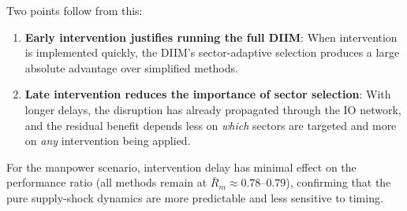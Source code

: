 Two points follow from this:
\begin{enumerate}
    \item \textbf{Early intervention justifies running the full DIIM}: When intervention is implemented quickly, the DIIM's sector-adaptive selection produces a large absolute advantage over simplified methods.
    \item \textbf{Late intervention reduces the importance of sector selection}: With longer delays, the disruption has already propagated through the IO network, and the residual benefit depends less on \emph{which} sectors are targeted and more on \emph{any} intervention being applied.
\end{enumerate}

For the manpower scenario, intervention delay has minimal effect on the performance ratio (all methods remain at $\bar{R}_m \approx 0.78$--$0.79$), confirming that the pure supply-shock dynamics are more predictable and less sensitive to timing.


\newpage
